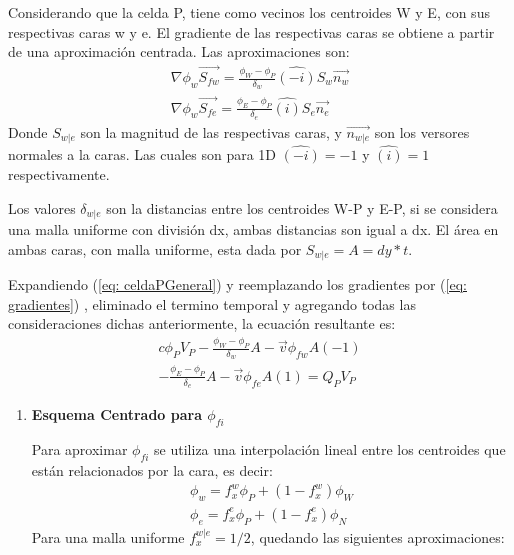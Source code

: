 \documentclass{article}
\begin{document}
\begin{enumerate}
    Considerando que la celda P, tiene como vecinos los centroides W y E, con sus respectivas caras w y e.
    El gradiente de las respectivas caras se obtiene a partir de una aproximación centrada. Las aproximaciones son:
    \begin{equation}
        \begin{aligned}
            \nabla \phi_w \vec{S_{fw}}= \frac{\phi_W - \phi_P}{\delta_w}\hat{(-i)}S_w\vec{n_w}\\
            \nabla \phi_w \vec{S_{fe}}= \frac{\phi_E - \phi_P}{\delta_e}\hat{(i)}S_e\vec{n_e}
        \end{aligned}
        \label{eq: gradientes}
    \end{equation} 
    Donde $S_{w|e}$ son la magnitud de las respectivas caras, y $\vec{n_{w|e}}$ son los versores normales a la caras. Las cuales son para 1D $\hat{(-i)} = -1$ y $\hat{(i)} = 1$ respectivamente.
    
    
    Los valores $\delta_{w|e}$ son la distancias entre los centroides W-P y E-P, si se considera una malla uniforme con división dx, ambas distancias son igual a dx.
    El área en ambas caras, con malla uniforme, esta dada por $S_{w|e}= A = dy*t$.
    
    Expandiendo (\ref{eq: celdaPGeneral}) y reemplazando los gradientes por (\ref{eq: gradientes}) , eliminado el termino temporal y agregando todas las consideraciones dichas anteriormente, la ecuación resultante es:
    \begin{multline}
        c \phi_P V_P -  \frac{\phi_W - \phi_P}{\delta_w} A - \vec{v}\phi_{fw} A(-1) \\ 
        - \frac{\phi_E - \phi_P} {\delta_e} A - \vec{v}\phi_{fe} A (1)  = Q_P V_P    
        \label{eq: celdaPGrad}
    \end{multline}
     \begin{enumerate}
         \item 
            \textbf{Esquema Centrado para $\phi_{fi}$} 
            
            Para aproximar $\phi_{fi}$ se utiliza una interpolación lineal entre los centroides que están relacionados por la cara, es decir:
            \begin{equation*}
                \begin{aligned}
                    \phi_w = f_x^w \phi_P + (1 - f_x^w) \phi_W \\
                    \phi_e = f_x^e \phi_P + (1 - f_x^e) \phi_N 
                \end{aligned}      
            \end{equation*} 
            Para una malla uniforme $f_x^{w|e} = 1/2$, quedando las siguientes aproximaciones:
            

\end{enumerate}
\end{enumerate}
\end{document}
